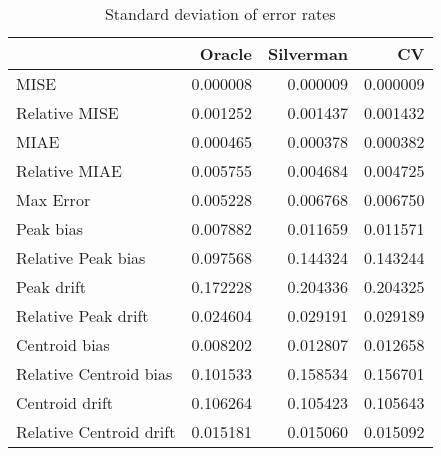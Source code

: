 \begin{table}[ht]
\centering
\begin{tabular}{lrrr}
  \hline
 & Oracle & Silverman & CV \\ 
  \hline
MISE & 0.000008 & 0.000009 & 0.000009 \\ 
  Relative MISE & 0.001252 & 0.001437 & 0.001432 \\ 
  MIAE & 0.000465 & 0.000378 & 0.000382 \\ 
  Relative MIAE & 0.005755 & 0.004684 & 0.004725 \\ 
  Max Error & 0.005228 & 0.006768 & 0.006750 \\ 
  Peak bias & 0.007882 & 0.011659 & 0.011571 \\ 
  Relative Peak bias & 0.097568 & 0.144324 & 0.143244 \\ 
  Peak drift & 0.172228 & 0.204336 & 0.204325 \\ 
  Relative Peak drift & 0.024604 & 0.029191 & 0.029189 \\ 
  Centroid bias & 0.008202 & 0.012807 & 0.012658 \\ 
  Relative Centroid bias & 0.101533 & 0.158534 & 0.156701 \\ 
  Centroid drift & 0.106264 & 0.105423 & 0.105643 \\ 
  Relative Centroid drift & 0.015181 & 0.015060 & 0.015092 \\ 
   \hline
\end{tabular}
\caption{Standard deviation of error rates} 
\label{tbl:stddev_error_rates}
\end{table}
